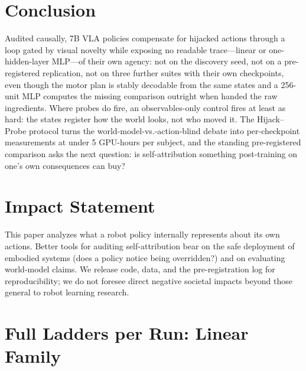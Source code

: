 \documentclass{article}
\begin{document}
\section{Conclusion}

Audited causally, 7B VLA policies compensate for hijacked actions through a
loop gated by visual novelty while exposing no readable trace---linear or
one-hidden-layer MLP---of their own agency: not on the discovery seed, not
on a pre-registered replication, not on three further suites with their own
checkpoints, even though the motor plan is stably decodable from the same
states and a 256-unit MLP computes the missing comparison outright when
handed the raw ingredients. Where probes do fire, an observables-only
control fires at least as hard: the states register how the world looks,
not who moved it. The Hijack--Probe protocol turns the
world-model-vs.-action-blind debate into per-checkpoint measurements at
under 5 GPU-hours per subject, and the standing pre-registered comparison
asks the next question: is self-attribution something post-training on
one's own consequences can buy?

\section*{Impact Statement}

This paper analyzes what a robot policy internally represents about its own
actions. Better tools for auditing self-attribution bear on the safe
deployment of embodied systems (does a policy notice being overridden?) and
on evaluating world-model claims. We release code, data, and the
pre-registration log for reproducibility; we do not foresee direct negative
societal impacts beyond those general to robot learning research.




\appendix
\onecolumn

\section{Full Ladders per Run: Linear Family}
\label{app:ladders}
\end{document}
